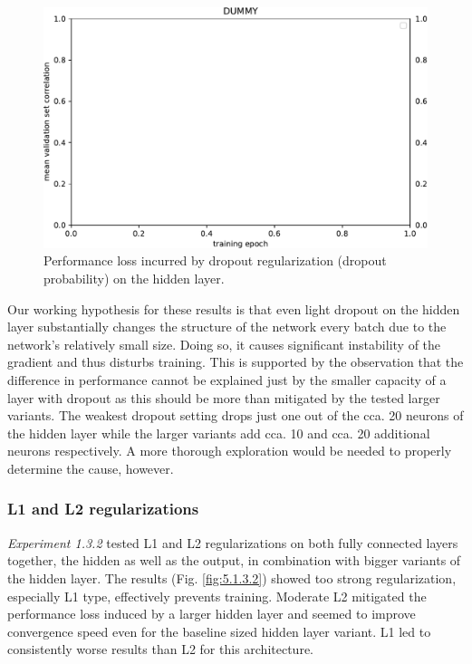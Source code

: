 \begin{figure}[H]
    \centering
    \includegraphics[width=1\textwidth]{../figures/05_dummy}
    \caption[Experiment 5.1.3.1]{Performance loss incurred by dropout regularization (dropout probability) on the hidden layer.}
    \label{fig:5.1.3.1}
\end{figure}

Our working hypothesis for these results is that even light dropout on the hidden layer substantially changes the structure of the network every batch due to the network’s relatively small size. Doing so, it causes significant instability of the gradient and thus disturbs training. This is supported by the observation that the difference in performance cannot be explained just by the smaller capacity of a layer with dropout as this should be more than mitigated by the tested larger variants. The weakest dropout setting drops just one out of the cca. 20 neurons of the hidden layer while the larger variants add cca. 10 and cca. 20 additional neurons respectively. A more thorough exploration would be needed to properly determine the cause, however.

\subsubsection{L1 and L2 regularizations}

\textit{Experiment 1.3.2} tested L1 and L2 regularizations on both fully connected layers together, the hidden as well as the output, in combination with bigger variants of the hidden layer. The results (Fig. \ref{fig:5.1.3.2}) showed too strong regularization, especially L1 type, effectively prevents training. Moderate L2 mitigated the performance loss induced by a larger hidden layer and seemed to improve convergence speed even for the baseline sized hidden layer variant. L1 led to consistently worse results than L2 for this architecture.

